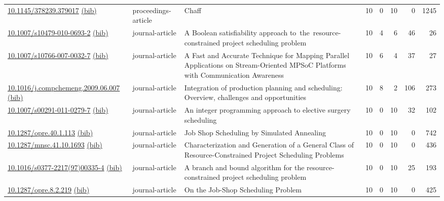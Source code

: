 {\begin{longtable}{p{5cm}lp{11cm}rrrrr}
\href{http://dx.doi.org/10.1145/378239.379017}{10.1145/378239.379017} \href{https://www.doi2bib.org/bib/10.1145/378239.379017}{(bib)} & proceedings-article & Chaff & 10 & 0 & 10 & 0 & 1245 \\
\href{http://dx.doi.org/10.1007/s10479-010-0693-2}{10.1007/s10479-010-0693-2} \href{https://www.doi2bib.org/bib/10.1007/s10479-010-0693-2}{(bib)} & journal-article & A Boolean satisfiability approach to the resource-constrained project scheduling problem & 10 & 4 & 6 & 46 & 26 \\
\href{http://dx.doi.org/10.1007/s10766-007-0032-7}{10.1007/s10766-007-0032-7} \href{https://www.doi2bib.org/bib/10.1007/s10766-007-0032-7}{(bib)} & journal-article & A Fast and Accurate Technique for Mapping Parallel Applications on Stream-Oriented MPSoC Platforms with Communication Awareness & 10 & 6 & 4 & 37 & 27 \\
\href{http://dx.doi.org/10.1016/j.compchemeng.2009.06.007}{10.1016/j.compchemeng.2009.06.007} \href{https://www.doi2bib.org/bib/10.1016/j.compchemeng.2009.06.007}{(bib)} & journal-article & Integration of production planning and scheduling: Overview, challenges and opportunities & 10 & 8 & 2 & 106 & 273 \\
\href{http://dx.doi.org/10.1007/s00291-011-0279-7}{10.1007/s00291-011-0279-7} \href{https://www.doi2bib.org/bib/10.1007/s00291-011-0279-7}{(bib)} & journal-article & An integer programming approach to elective surgery scheduling & 10 & 0 & 10 & 32 & 102 \\
\href{http://dx.doi.org/10.1287/opre.40.1.113}{10.1287/opre.40.1.113} \href{https://www.doi2bib.org/bib/10.1287/opre.40.1.113}{(bib)} & journal-article & Job Shop Scheduling by Simulated Annealing & 10 & 0 & 10 & 0 & 742 \\
\href{http://dx.doi.org/10.1287/mnsc.41.10.1693}{10.1287/mnsc.41.10.1693} \href{https://www.doi2bib.org/bib/10.1287/mnsc.41.10.1693}{(bib)} & journal-article & Characterization and Generation of a General Class of Resource-Constrained Project Scheduling Problems & 10 & 0 & 10 & 0 & 436 \\
\href{http://dx.doi.org/10.1016/s0377-2217(97)00335-4}{10.1016/s0377-2217(97)00335-4} \href{https://www.doi2bib.org/bib/10.1016/s0377-2217(97)00335-4}{(bib)} & journal-article & A branch and bound algorithm for the resource-constrained project scheduling problem & 10 & 0 & 10 & 25 & 193 \\
\href{http://dx.doi.org/10.1287/opre.8.2.219}{10.1287/opre.8.2.219} \href{https://www.doi2bib.org/bib/10.1287/opre.8.2.219}{(bib)} & journal-article & On the Job-Shop Scheduling Problem & 10 & 0 & 10 & 0 & 425 \\

\end{longtable}}
